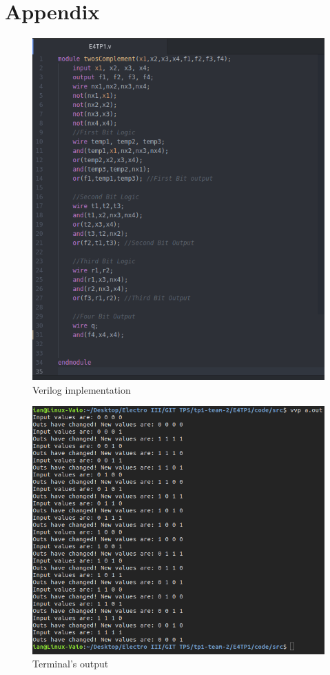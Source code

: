 \newpage
{}
\section{Appendix}

\begin{figure}[h!] %
\begin{centering}
\includegraphics[scale=0.4]{../E4TP1/images/5}
\par\end{centering}
\caption{\color{cyan}Verilog implementation}
\label{fig:figura4.6}
\end{figure}

\begin{figure}[h!]%
\begin{centering}
\includegraphics[scale=0.4]{../E4TP1/images/6}
\par\end{centering}
\caption{\color{cyan}Terminal's output}
\label{fig:figura4.7}
\end{figure}